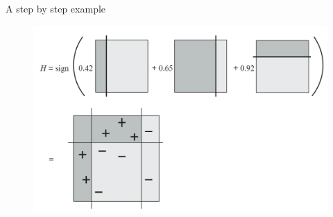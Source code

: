 \begin{frame}{A step by step example}
    \begin{figure}
        \includegraphics[width=\textwidth]{img/example_result}
    \end{figure}
\end{frame}